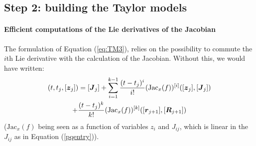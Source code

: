 \documentclass{sig-alternate-05-2015} %
\newcommand\ForAuthors[1]%
 {\par\smallskip                     %
  \begin{center}%
   \fbox%
   {\parbox{0.9\linewidth}%
    {\raggedright\sc--- #1}%
   }%
  \end{center}%
  \par\smallskip                     %
 }
\newtheorem{remark}{Remark}
\begin{document}
\subsection{Step 2: building the Taylor models}

\paragraph{Efficient computations of the Lie derivatives of the Jacobian}

\label{efficientLieJacobian}

The formulation of Equation (\ref{eq:TM3}), 
relies on the possibility to commute the $i$th Lie derivative
with the calculation of the Jacobian. Without this, we would have written:
\begin{multline}
[\J](t,t_j,[{\z}_j]) = [{\J}_j] + \sum\limits_{i=1}^{k-1} \frac{(t-t_j)^i}{i !} (\mbox{Jac}_x(f))^{[i]}([{\z}_{j}],[{\J}_j]) \\ +  \frac{(t-t_j)^k}{k !} (\mbox{Jac}_x(f))^{[k]}([{\r}_{j+1}],[\bfm{R}_{j+1}])
\label{eq:TM3b}
\end{multline}
\noindent ($\mbox{Jac}_x(f)$ being seen as a function of variables $z_i$ and $J_{ij}$, which 
is linear in the $J_{ij}$ as in Equation (\ref{pqentry})). 
\end{document}
